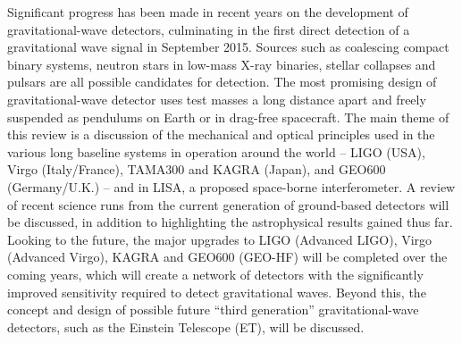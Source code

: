 Significant progress has been made in recent years on the development of
gravitational-wave detectors, culminating in the first direct detection of
a gravitational wave signal in September 2015. Sources such as coalescing compact binary
systems, neutron stars in low-mass X-ray binaries, stellar collapses and
pulsars are all possible candidates for detection. The most promising design
of gravitational-wave detector uses test masses a long distance apart and
freely suspended as pendulums on Earth or in drag-free spacecraft.  The
main theme of this review is a discussion of the mechanical and optical
principles used in the various long baseline systems in operation around the
world -- LIGO (USA), Virgo (Italy/France), TAMA300 and KAGRA (Japan), and
GEO600 (Germany/U.K.) -- and in LISA, a proposed space-borne interferometer. A
review of recent science runs from the current generation of ground-based
detectors will be discussed, in addition to highlighting the astrophysical
results gained thus far. Looking to the future, the major upgrades to LIGO
(Advanced LIGO), Virgo (Advanced Virgo), KAGRA and GEO600 (GEO-HF) will be
completed over the coming years, which will create a network of detectors
with the significantly improved sensitivity required to detect
gravitational waves. Beyond this, the concept and design of possible
future ``third generation'' gravitational-wave detectors, such as the
Einstein Telescope (ET), will be discussed.
  
  